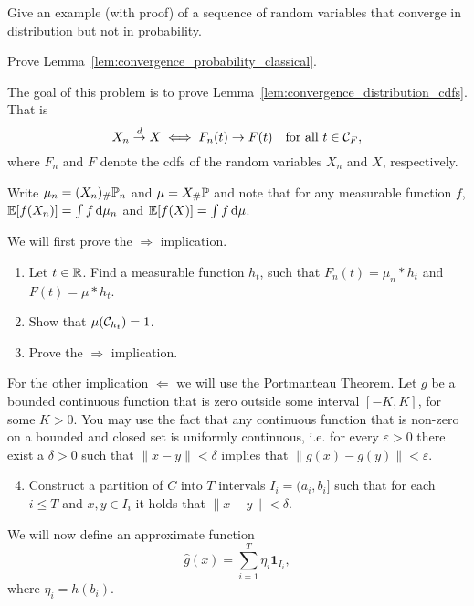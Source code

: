 \begin{problem}\label{prb:dlim_not_plim}
Give an example (with proof) of a sequence of random variables that converge in distribution but not in probability.
\end{problem}

\begin{problem}\label{prb:convergence_probability_classic}
Prove Lemma~\ref{lem:convergence_probability_classical}.
\end{problem}

\begin{problem}\label{prb:convergence_distribution}
The goal of this problem is to prove Lemma~\ref{lem:convergence_distribution_cdfs}. That is
\[
	X_n \stackrel{d}{\rightarrow} X \iff F_n(t) \to F(t) \quad \text{for all } t \in \mathcal C_F,
\]
where $F_n$ and $F$ denote the cdfs of the random variables $X_n$ and $X$, respectively.

Write $\mu_n = (X_n)_\# \mathbb P_n$ and $\mu = X_\# \mathbb P$ and note that for any measurable function $f$, $\mathbb E[f(X_n)] = \int f \, \mathrm{d} \mu_n$ and $\mathbb E[f(X)] = \int f \, \mathrm{d} \mu$.

We will first prove the $\Rightarrow$ implication. 
\begin{enumerate}[label={(\alph*)}]
\item Let $t \in \mathbb R$. Find a measurable function $h_t$, such that $F_n(t) = \mu_n \ast h_t$ and $F(t) = \mu \ast h_t$.
\item Show that $\mu(\mathcal C_{h_t}) = 1$.
\item Prove the $\Rightarrow$ implication. 
\end{enumerate}

For the other implication $\Leftarrow$ we will use the Portmanteau Theorem. Let $g$ be a bounded continuous function that is zero outside some interval $[-K,K]$, for some $K > 0$. You may use the fact that any continuous function that is non-zero on a bounded and closed set is uniformly continuous, i.e. for every $\varepsilon > 0$ there exist a $\delta > 0$ such that $\|x-y\| < \delta$ implies that $\|g(x) - g(y)\| < \varepsilon$. 
\begin{enumerate}[label={(\alph*)}]
\setcounter{enumi}{3}
\item Construct a partition of $C$ into $T$ intervals $I_i = (a_i, b_i]$ such that for each $i \le T$ and $x, y \in I_i$ it holds that $\|x - y\| < \delta$.
\end{enumerate}

We will now define an approximate function
\[
	\hat{g}(x) = \sum_{i = 1}^T \eta_i \mathbf{1}_{I_i},
\]
where $\eta_i = h(b_i)$.


\end{problem}
